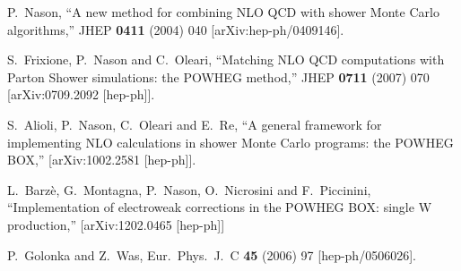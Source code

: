 \documentclass[paper]{JHEP3}
\begin{document}
\begin{thebibliography}{10}

  P.~Nason,
  ``A new method for combining NLO QCD with shower Monte Carlo algorithms,''
  JHEP {\bf 0411} (2004) 040
  [arXiv:hep-ph/0409146].

  S.~Frixione, P.~Nason and C.~Oleari,
``Matching NLO QCD computations with Parton Shower simulations: the POWHEG
method,''
  JHEP {\bf 0711} (2007) 070
  [arXiv:0709.2092 [hep-ph]].

  S.~Alioli, P.~Nason, C.~Oleari and E.~Re,
``A general framework for implementing NLO calculations in shower Monte Carlo
  programs: the POWHEG BOX,''
  [arXiv:1002.2581 [hep-ph]].

  L.~Barz\`e, G.~Montagna, P.~Nason, O.~Nicrosini and F.~Piccinini,
  ``Implementation of electroweak corrections in the POWHEG BOX: single W production,''
  [arXiv:1202.0465 [hep-ph]]

  P.~Golonka and Z.~Was,
  Eur.\ Phys.\ J.\ C {\bf 45} (2006) 97
  [hep-ph/0506026].

\end{thebibliography}
\end{document}
